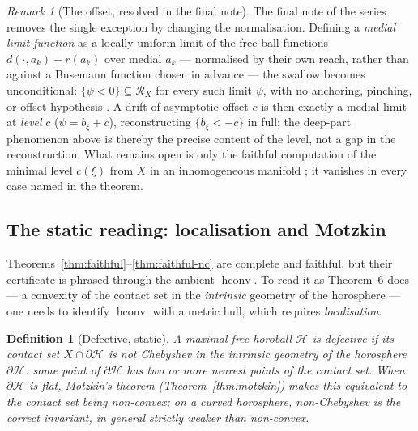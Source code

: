 \documentclass[11pt]{article}
\newtheorem{definition}[theorem]{Definition}
\theoremstyle{remark}
\newtheorem{remark}[theorem]{Remark}
\newcommand{\X}{X}
\newcommand{\Rx}{\mathcal{R}_{\X}}
\newcommand{\Hb}[1]{\mathcal{H}_{#1}}
\newcommand{\hconv}{\operatorname{hconv}}
\begin{document}
\begin{remark}[The offset, resolved in the final note]
\label{rem:offset-resolved}
The final note of the series \cite{C} removes the single exception by
changing the normalisation. Defining a \emph{medial limit function} as
a locally uniform limit of the free-ball functions
$d(\cdot,a_{k})-r(a_{k})$ over medial $a_{k}$ --- normalised by their
own reach, rather than against a Busemann function chosen in advance
--- the swallow becomes unconditional: $\{\psi<0\}\subseteq\Rx$ for
every such limit $\psi$, with no anchoring, pinching, or offset
hypothesis \cite[Lem.~4.1]{C}. A drift of asymptotic offset $c$ is
then exactly a medial limit at \emph{level} $c$ ($\psi=b_{\xi}+c$),
reconstructing $\{b_{\xi}<-c\}$ in full; the deep-part phenomenon
above is thereby the precise content of the level, not a gap in the
reconstruction. What remains open is only the faithful computation of
the minimal level $c(\xi)$ from $X$ in an inhomogeneous manifold
\cite[Rem.~4.6]{C}; it vanishes in every case named in the theorem.
\end{remark}

\subsection{The static reading: localisation and Motzkin}
\label{sec:static}

Theorems~\ref{thm:faithful}--\ref{thm:faithful-nc} are complete and
faithful, but their certificate is phrased through the ambient
$\hconv$. To read it as Theorem~6 does --- a convexity of the contact
set in the \emph{intrinsic} geometry of the horosphere --- one needs to
identify $\hconv$ with a metric hull, which requires \emph{localisation}.

\begin{definition}[Defective, static]\label{def:defective}
A maximal free horoball $\Hb{}$ is \emph{defective} if its contact set
$X\cap\partial\Hb{}$ is \emph{not Chebyshev} in the intrinsic geometry
of the horosphere $\partial\Hb{}$: some point of $\partial\Hb{}$ has
two or more nearest points of the contact set. When $\partial\Hb{}$ is
flat, Motzkin's theorem (Theorem~\ref{thm:motzkin}) makes this
equivalent to the contact set being non-convex; on a curved
horosphere, non-Chebyshev is the correct invariant, in general
strictly weaker than non-convex.
\end{definition}
\end{document}
